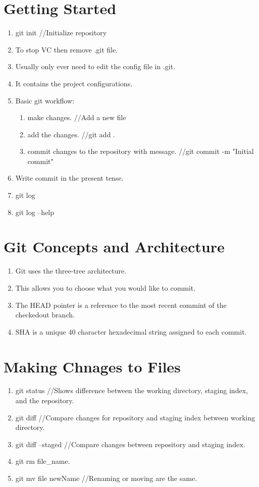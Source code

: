 \documentclass[a4paper, fontsize=12pt, twoside]{article} %
\begin{document}
\section{Getting Started}
\begin{enumerate}
	\item git init //Initialize repository
	\item To stop VC then remove .git file.
	\item Usually only ever need to edit the config file in .git.
	\item It contains the project configurations.
	\item Basic git workflow:
		\begin{enumerate}
			\item make changes. //Add a new file
			\item add the changes. //git add .
			\item commit changes to the repository with message. //git commit -m "Initial commit"
		\end{enumerate}
	\item Write commit in the present tense.
	\item git log				
	\item git log --help
\end{enumerate}
\section{Git Concepts and Architecture}
\begin{enumerate}
	\item Git uses the three-tree architecture.
	\item This allows you to choose what you would like to commit.
	\item The HEAD pointer is a reference to the most recent commint of the checkedout branch.
	\item SHA is a unique 40 character hexadecimal string assigned to each commit.
\end{enumerate}
\section{Making Chnages to Files}
\begin{enumerate}
	\item git status //Shows difference between the working directory, staging index, and the repository.
	\item git diff //Compare changes for repository and staging index between working directory.
	\item git diff --staged //Compare changes between repository and staging index.
	\item git rm file\_name.
	\item git mv file newName //Renaming or moving are the same.
\end{enumerate}
\end{document}

